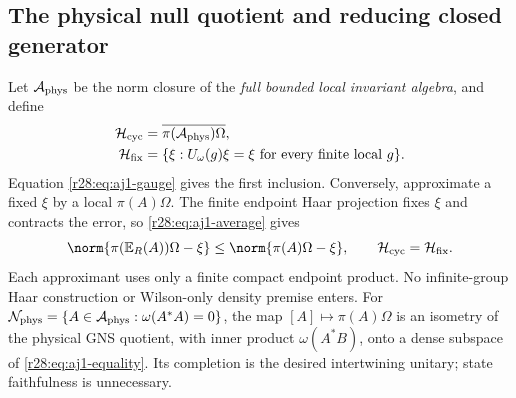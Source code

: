 \subsection{The physical null quotient and reducing closed generator}
Let $\mathcal A_{\rm phys}$ be the norm closure of the \emph{full bounded local invariant algebra}, and define
\begin{align}
 \mathcal H_{\rm cyc}&=\overline{\pi(\mathcal A_{\rm phys})\Omega},\notag\\
 \mathcal H_{\rm fix}&=\{\xi:U_\omega(g)\xi=\xi
                  \text{ for every finite local }g\}.
\end{align}
Equation \eqref{r28:eq:aj1-gauge} gives the first inclusion. Conversely, approximate a fixed $\xi$ by a local $\pi(A)\Omega$. The finite endpoint Haar projection fixes $\xi$ and contracts the error, so \eqref{r28:eq:aj1-average} gives
\begin{equation}
 \norm{\pi(\mathbb E_R(A))\Omega-\xi}
 \le\norm{\pi(A)\Omega-\xi},
 \qquad \mathcal H_{\rm cyc}=\mathcal H_{\rm fix}.
 \label{r28:eq:aj1-equality}
\end{equation}
Each approximant uses only a finite compact endpoint product. No infinite-group Haar construction or Wilson-only density premise enters. For $\mathcal N_{\rm phys}=\{A\in\mathcal A_{\rm phys}:\omega(A^*A)=0\}$, the map $[A]\mapsto\pi(A)\Omega$ is an isometry of the physical GNS quotient, with inner product $\omega(A^*B)$, onto a dense subspace of \eqref{r28:eq:aj1-equality}. Its completion is the desired intertwining unitary; state faithfulness is unnecessary.

